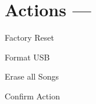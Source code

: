 \section{Actions --- \UiKey{\DO}}

Factory Reset


Format USB

Erase all Songs














































Confirm Action
